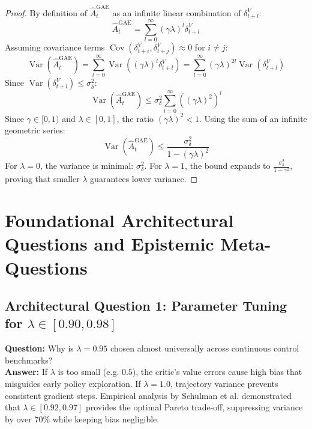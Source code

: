 \documentclass[11pt,a4paper]{article}
\theoremstyle{definition}
\begin{document}
\begin{proof}
By definition of $\widehat{A}_t^{\text{GAE}}$ as an infinite linear combination of $\delta_{t+l}^V$:
{\boldmath
\begin{equation}
\widehat{A}_t^{\text{GAE}} = \sum_{l=0}^\infty (\gamma \lambda)^l \delta_{t+l}^V
\end{equation}
}
Assuming covariance terms $\operatorname{Cov}(\delta_{t+i}^V, \delta_{t+j}^V) \approx 0$ for $i \neq j$:
{\boldmath
\begin{equation}
\operatorname{Var}\left( \widehat{A}_t^{\text{GAE}} \right) = \sum_{l=0}^\infty \operatorname{Var}\left( (\gamma \lambda)^l \delta_{t+l}^V \right) = \sum_{l=0}^\infty (\gamma \lambda)^{2l} \operatorname{Var}(\delta_{t+l}^V)
\end{equation}
}
Since $\operatorname{Var}(\delta_{t+l}^V) \le \sigma_\delta^2$:
{\boldmath
\begin{equation}
\operatorname{Var}\left( \widehat{A}_t^{\text{GAE}} \right) \le \sigma_\delta^2 \sum_{l=0}^\infty \left( (\gamma \lambda)^2 \right)^l
\end{equation}
}
Since $\gamma \in [0, 1)$ and $\lambda \in [0, 1]$, the ratio $(\gamma \lambda)^2 < 1$.
Using the sum of an infinite geometric series:
{\boldmath
\begin{equation}
\operatorname{Var}\left( \widehat{A}_t^{\text{GAE}} \right) \le \frac{\sigma_\delta^2}{1 - (\gamma \lambda)^2}
\end{equation}
}
For $\lambda = 0$, the variance is minimal: $\sigma_\delta^2$. For $\lambda = 1$, the bound expands to $\frac{\sigma_\delta^2}{1 - \gamma^2}$, proving that smaller $\lambda$ guarantees lower variance.
\end{proof}

\section{Foundational Architectural Questions and Epistemic Meta-Questions}

\subsection{Architectural Question 1: Parameter Tuning for $\lambda \in [0.90, 0.98]$}
\textbf{Question:} Why is $\lambda = 0.95$ chosen almost universally across continuous control benchmarks?\\
\textbf{Answer:} If $\lambda$ is too small (e.g. $0.5$), the critic's value errors cause high bias that misguides early policy exploration. If $\lambda = 1.0$, trajectory variance prevents consistent gradient steps. Empirical analysis by Schulman et al. demonstrated that $\lambda \in [0.92, 0.97]$ provides the optimal Pareto trade-off, suppressing variance by over 70\% while keeping bias negligible.
\end{document}
